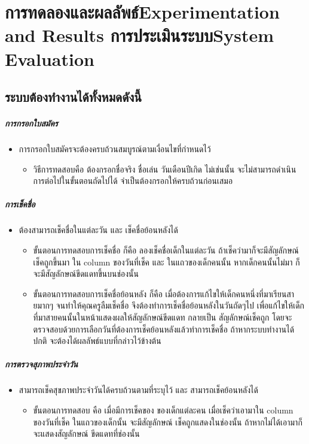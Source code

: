 \chapter{\ifproject%
\ifcpe การทดลองและผลลัพธ์\else Experimentation and Results\fi
\else%
\ifcpe การประเมินระบบ\else System Evaluation\fi
\fi}


\section{ระบบต้องทำงานได้ทั้งหมดดังนี้}
\paragraph{การกรอกใบสมัคร}
\begin{itemize}
    \item การกรอกใบสมัครจะต้องครบถ้วนสมบูรณ์ตามเงื่อนไขที่กำหนดไว้
    \begin{itemize}
        \item วิธีการทดสอบคือ ต้องกรอกชื่อจริง ชื่อเล่น วันเดือนปีเกิด ไม่เช่นนั้น จะไม่สามารถดำเนินการต่อไปในขั้นตอนถัดไปได้ จำเป็นต้องกรอกให้ครบถ้วนก่อนเสมอ
    \end{itemize}
\end{itemize}
\paragraph{การเช็คชื่อ}
\begin{itemize}
    \item ต้องสามารถเช็คชื่อในแต่ละวัน และ เช็คชื่อย้อนหลังได้
    \begin{itemize}
        \item ขั้นตอนการทดสอบการเช็คชื่อ  ก็คือ  ลองเช็คชื่อเด็กในแต่ละวัน  ถ้าเช็คว่ามาก็จะมีสัญลักษณ์เช็คถูกขึ้นมา ใน column ของวันที่เช็ค และ ในแถวของเด็กคนนั้น  หากเด็กคนนั้นไม่มา ก็จะมีสัญลักษณ์ขีดแดทขึ้นบนช่องนั้น
        \item ขั้นตอนการทดสอบการเช็คชื่อย้อนหลัง  ก็คือ  เมื่อต้องการแก้ไขให้เด็กคนหนึ่งที่มาเรียนสายมากๆ  จนทำให้คุณครูลืมเช็คชื่อ  จึงต้องทำการเช็คชื่อย้อนหลังในวันถัดๆไป  เพื่อแก้ไขให้เด็กที่มาสายคนนั้นในหน้าแสดงผลให้สัญลักษณ์ขีดแดท กลายเป็น สัญลักษณ์เช็คถูก  โดยจะตรวจสอบด้วยการเลือกวันที่ต้องการเช็คย้อนหลังแล้วทำการเช็คชื่อ  ถ้าหากระบบทำงานได้ปกติ  จะต้องได้ผลลัพธ์แบบที่กล่าวไว้ข้างต้น
    \end{itemize}
\end{itemize}
\paragraph{การตรวจสุภาพประจำวัน}
\begin{itemize}
    \item สามารถเช็คสุขภาพประจำวันได้ครบถ้วนตามที่ระบุไว้ และ สามารถเช็คย้อนหลังได้
    \begin{itemize}
        \item ขั้นตอนการทดสอบ คือ เมื่อมีการเช็คของ ของเด็กแต่ละคน  เมื่อเช็คว่าเอามาใน column ของวันที่เช็ค ในแถวของเด็กนั้น จะมีสัญลักษณ์ เช็คถูกแสดงในช่องนั้น  ถ้าหากไม่ได้เอามาก็จะแสดงสัญลักษณ์ ขีดแดทที่ช่องนั้น
    \end{itemize}
\end{itemize}
